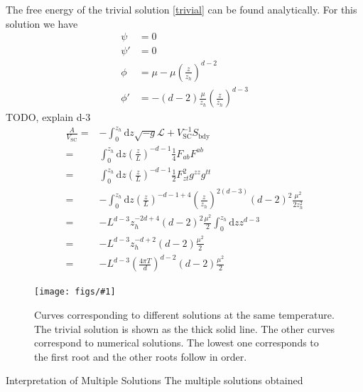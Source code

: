 \documentclass[12pt]{report}
\renewcommand{\d}{\ensuremath{\mathrm{d}}}
\renewcommand{\L}{\ensuremath{\mathcal{L}}}
\newcommand{\At}{\ensuremath{{\phi}}}
\newcommand{\fig}[3]{
\begin{figure}
\centering
\texttt{[image: figs/\#1]}
\caption{#2}
\end{figure}
}
\begin{document}
The free energy of the trivial solution \eqref{trivial} can be found analytically. For this solution we have
\begin{equation}
 \begin{split}
  \psi&=0\\
  \psi'&=0\\
  \At&=\mu-\mu\left(\frac{z}{z_h}\right)^{d-2}\\
  \At'&=-(d-2)\frac{\mu}{z_h}\left(\frac{z}{z_h}\right)^{d-3}
 \end{split}
\end{equation}TODO, explain d-3
\begin{equation}
\begin{split}
 \frac{A}{V_\mathrm{SC}}=&-\int_0^{z_h}\d z \sqrt{-g}\L+V_\mathrm{SC}^{-1}S_{\mathrm{bdy}}\\
=&\int_0^{z_h}\d z \left(\frac{z}{L}\right)^{-d-1}\frac{1}{4}F_{ab}F^{ab}\\
=&\int_0^{z_h}\d z \left(\frac{z}{L}\right)^{-d-1}\frac{1}{2}F_{zt}^2g^{zz}g^{tt}\\
=&-\int_0^{z_h}\d z \left(\frac{z}{L}\right)^{-d-1+4}\left(\frac{z}{z_h}\right)^{2(d-3)}(d-2)^2\frac{\mu^2}{2z_h^2}\\
=&-L^{d-3}z_h^{-2d+4}(d-2)^2\frac{\mu^2}{2} \int_0^{z_h}\d z z^{d-3}\\
=&-L^{d-3}z_h^{-d+2}(d-2)\frac{\mu^2}{2}\\
=&-L^{d-3}\left(\frac{4\pi T}{d}\right)^{d-2}(d-2)\frac{\mu^2}{2}
\end{split}
\end{equation}
\fig{A}{Curves corresponding to different solutions at the same temperature. The trivial solution is shown as the thick solid line. The other curves correspond to numerical solutions. The lowest one corresponds to the first root and the other roots follow in order.\label{f:A}}
\subsection{Interpretation of Multiple Solutions}
The multiple solutions obtained 
\end{document}
